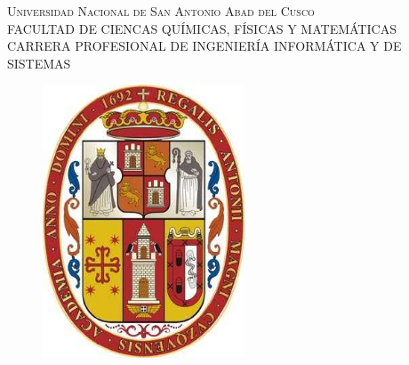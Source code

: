 \documentclass[12pt,oneside,a4paper]{book}
\theoremstyle{definition}
\begin{document}
\frontmatter 
\fancyhead[RO]{{\footnotesize\rightmark}\hspace{2em}\thepage}
\setcounter{tocdepth}{4}
\setcounter{secnumdepth}{4}
\fancyhead[LE]{\thepage\hspace{2em}\footnotesize{\leftmark}}
\fancyhead[RE,LO]{}
\fancyhead[RO]{{\footnotesize\rightmark}\hspace{2em}\thepage}
\onehalfspacing  %

\thispagestyle{empty}

\begin{center}

\textsc{\large Universidad Nacional de San Antonio Abad del Cusco}\\\vspace*{0.04in}
\textsc{FACULTAD DE CIENCAS QUÍMICAS, FÍSICAS Y MATEMÁTICAS}\\
\vspace*{0.04in}
CARRERA PROFESIONAL DE INGENIERÍA INFORMÁTICA Y DE SISTEMAS \\

\captionsetup[figure]{labelformat=empty}
\begin{figure}[htb]
\begin{center}
\includegraphics[width=6cm]{UNSAAC}
\caption[]{}
\end{center}
\end{figure}

\newcommand{\topline}{
  \rule{164mm}{2mm}
  \vspace*{-0.23in}
  \hrule  
}
\newcommand{\downline}{
  \hrule  
  \vspace*{0.02in}
  \rule{164mm}{2mm}
}


\end{center}
\end{document}
